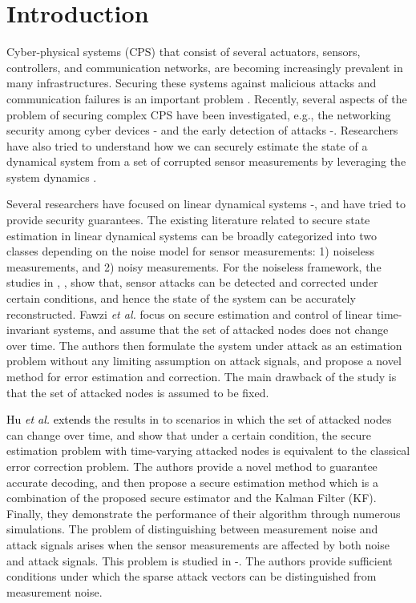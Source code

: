 
\section{Introduction}\label{sec:introduction}

Cyber-physical systems (CPS) that consist of several actuators, sensors, controllers, and communication networks, are becoming increasingly prevalent in many infrastructures. Securing these systems against malicious attacks and communication failures is an important problem \cite{cps1}. Recently, several aspects of the problem of securing complex CPS have been investigated, e.g., the networking security among cyber devices \cite{security_0}-\!\!\cite{comm_net_4} and the early detection of attacks \cite{comm_early_1}-\!\!\cite{comm_early_2}. Researchers have also tried to understand how we can securely estimate the state of a dynamical system from a set of corrupted sensor measurements by leveraging the system dynamics \cite{ctrl_sec8}.



Several researchers have focused on linear dynamical systems \cite{ctrl_sec8}-\!\!\cite{new4}, and have tried to provide security guarantees. The existing literature related to secure state estimation in linear dynamical systems can be broadly categorized into two classes depending on the noise model for sensor measurements: 1) noiseless measurements, and 2) noisy measurements. For the noiseless framework, the studies in \cite{cps1}, \cite{ctrl_sec8}, \cite{new2} show that, sensor attacks can be detected and corrected under certain conditions, and hence the state of the system can be accurately reconstructed. Fawzi \textit{et al.} \cite{ctrl_sec8} focus on secure estimation and control of linear time-invariant systems, and assume that the set of attacked nodes does not change over time. The authors then formulate the system under attack as an estimation problem without any limiting assumption on attack signals, and propose a novel method for error estimation and correction. The main drawback of the study is that the set of attacked nodes is assumed to be fixed.


\textcolor{black}{Hu \textit{et al.} \cite{ctrl_sec9} extends} the results in \cite{ctrl_sec8} to scenarios in which the set of attacked nodes can change over time, and show that under a certain condition, the secure estimation problem with time-varying attacked nodes is equivalent to the classical error correction problem. The authors provide a novel method to guarantee accurate decoding, and then propose a secure estimation method which is a combination of the proposed secure estimator and the Kalman Filter (KF). Finally, they demonstrate the performance of their algorithm through numerous simulations. The problem of distinguishing between measurement noise and attack signals arises when the sensor measurements are affected by both noise and attack signals. This problem is studied in \cite{new4}-\!\!\cite{new10}. The authors provide sufficient conditions under which the
sparse attack vectors can be distinguished from measurement noise.


